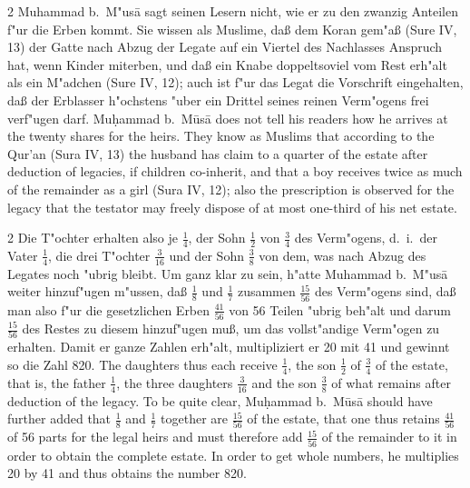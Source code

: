 \documentclass[10pt,a4paper]{article}
\renewcommand{\switchcolumn}{\syncronize\nointerlineskip\columnbreak}
\begin{document}
\begin{paracol}{2}
Muhammad b.\ M"us\=a sagt seinen Lesern nicht, wie er zu den zwanzig Anteilen f"ur die Erben kommt. Sie wissen als Muslime, da\ss{} dem Koran gem"a\ss{} (Sure IV, 13) der Gatte nach Abzug der Legate auf ein Viertel des Nachlasses Anspruch hat, wenn Kinder miterben, und da\ss{} ein Knabe doppeltsoviel vom Rest erh"alt als ein M"adchen (Sure IV, 12); auch ist f"ur das Legat die Vorschrift eingehalten, da\ss{} der Erblasser h"ochstens "uber ein Drittel seines reinen Verm"ogens frei verf"ugen darf.
\switchcolumn
Mu\d{h}ammad b.\ M\=us\=a does not tell his readers how he arrives at the twenty shares for the heirs. They know as Muslims that according to the Qur'an (Sura IV, 13) the husband has claim to a quarter of the estate after deduction of legacies, if children co-inherit, and that a boy receives twice as much of the remainder as a girl (Sura IV, 12); also the prescription is observed for the legacy that the testator may freely dispose of at most one-third of his net estate.
\end{paracol}

\begin{paracol}{2}
Die T"ochter erhalten also je $\frac{1}{4}$, der Sohn $\frac{1}{2}$ von $\frac{3}{4}$ des Verm"ogens, d.\ i.\ der Vater $\frac{1}{4}$, die drei T"ochter $\frac{3}{16}$ und der Sohn $\frac{3}{8}$ von dem, was nach Abzug des Legates noch "ubrig bleibt. Um ganz klar zu sein, h"atte Muhammad b.\ M"us\=a weiter hinzuf"ugen m"ussen, da\ss{} $\frac{1}{8}$ und $\frac{1}{7}$ zusammen $\frac{15}{56}$ des Verm"ogens sind, da\ss{} man also f"ur die gesetzlichen Erben $\frac{41}{56}$ von 56 Teilen "ubrig beh"alt und darum $\frac{15}{56}$ des Restes zu diesem hinzuf"ugen mu\ss{}, um das vollst"andige Verm"ogen zu erhalten. Damit er ganze Zahlen erh"alt, multipliziert er 20 mit 41 und gewinnt so die Zahl 820.
\switchcolumn
The daughters thus each receive $\frac{1}{4}$, the son $\frac{1}{2}$ of $\frac{3}{4}$ of the estate, that is, the father $\frac{1}{4}$, the three daughters $\frac{3}{16}$ and the son $\frac{3}{8}$ of what remains after deduction of the legacy. To be quite clear, Mu\d{h}ammad b.\ M\=us\=a should have further added that $\frac{1}{8}$ and $\frac{1}{7}$ together are $\frac{15}{56}$ of the estate, that one thus retains $\frac{41}{56}$ of 56 parts for the legal heirs and must therefore add $\frac{15}{56}$ of the remainder to it in order to obtain the complete estate. In order to get whole numbers, he multiplies 20 by 41 and thus obtains the number 820.
\end{paracol}
\end{document}
